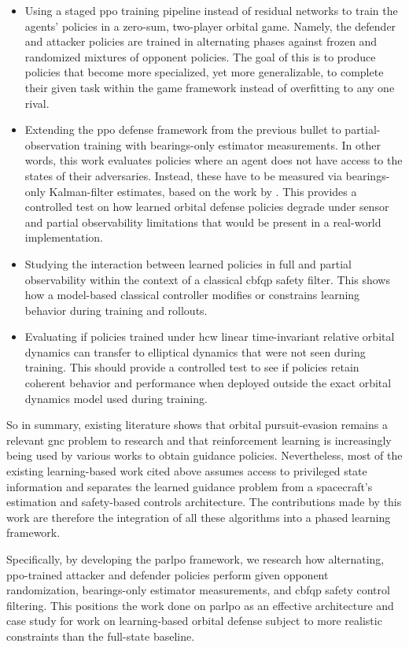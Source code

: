 \begin{itemize}
    \item Using a staged \acs{ppo} training pipeline instead of residual networks to train the agents' policies in a zero-sum, two-player orbital game. Namely, the defender and attacker policies are trained in alternating phases against frozen and randomized mixtures of opponent policies. The goal of this is to produce policies that become more specialized, yet more generalizable, to complete their given task within the game framework instead of overfitting to any one rival. 

    \item Extending the \acs{ppo} defense framework from the previous bullet to partial-observation training with bearings-only estimator measurements. In other words, this work evaluates policies where an agent does not have access to the states of their adversaries. Instead, these have to be measured via bearings-only Kalman-filter estimates, based on the work by \cite{aidala1979kalman}. This provides a controlled test on how learned orbital defense policies degrade under sensor and partial observability limitations that would be present in a real-world implementation.
    \item Studying the interaction between learned policies in full and partial observability within the context of a classical \acs{cbfqp} safety filter. This shows how a model-based classical controller modifies or constrains learning behavior during training and rollouts.
    \item Evaluating if policies trained under \acs{hcw} linear time-invariant relative orbital dynamics can transfer to elliptical dynamics that were not seen during training. This should provide a controlled test to see if policies retain coherent behavior and performance when deployed outside the exact orbital dynamics model used during training.
\end{itemize}

So in summary, existing literature shows that orbital pursuit-evasion remains a relevant \acs{gnc} problem to research and that reinforcement learning is increasingly being used by various works to obtain guidance policies. Nevertheless, most of the existing learning-based work cited above assumes access to privileged state information and separates the learned guidance problem from a spacecraft's estimation and safety-based controls architecture. The contributions made by this work are therefore the integration of all these algorithms into a phased learning framework.

Specifically, by developing the \acs{parlpo} framework, we research how alternating, \acs{ppo}-trained attacker and defender policies perform given opponent randomization, bearings-only estimator measurements, and \acs{cbfqp} safety control filtering. This positions the work done on \acs{parlpo} as an effective architecture and case study for work on learning-based orbital defense subject to more realistic constraints than the full-state baseline.
